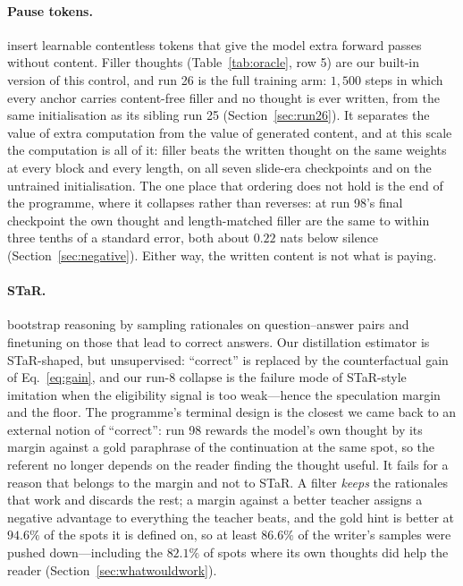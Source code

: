 \documentclass{article} %
\begin{document}
\paragraph{Pause tokens.} \citet{goyal2024think} insert learnable contentless tokens that give the model extra forward passes without content. Filler thoughts (Table~\ref{tab:oracle}, row 5) are our built-in version of this control, and run 26 is the full training arm: $1{,}500$ steps in which every anchor carries content-free filler and no thought is ever written, from the same initialisation as its sibling run 25 (Section~\ref{sec:run26}). It separates the value of extra computation from the value of generated content, and at this scale the computation is all of it: filler beats the written thought on the same weights at every block and every length, on all seven slide-era checkpoints and on the untrained initialisation. The one place that ordering does not hold is the end of the programme, where it collapses rather than reverses: at run 98's final checkpoint the own thought and length-matched filler are the same to within three tenths of a standard error, both about $0.22$ nats below silence (Section~\ref{sec:negative}). Either way, the written content is not what is paying.

\paragraph{STaR.} \citet{zelikman2022star} bootstrap reasoning by sampling rationales on question--answer pairs and finetuning on those that lead to correct answers. Our distillation estimator is STaR-shaped, but unsupervised: ``correct'' is replaced by the counterfactual gain of Eq.~\eqref{eq:gain}, and our run-8 collapse is the failure mode of STaR-style imitation when the eligibility signal is too weak---hence the speculation margin and the floor. The programme's terminal design is the closest we came back to an external notion of ``correct'': run 98 rewards the model's own thought by its margin against a gold paraphrase of the continuation at the same spot, so the referent no longer depends on the reader finding the thought useful. It fails for a reason that belongs to the margin and not to STaR. A filter \emph{keeps} the rationales that work and discards the rest; a margin against a better teacher assigns a negative advantage to everything the teacher beats, and the gold hint is better at $94.6\%$ of the spots it is defined on, so at least $86.6\%$ of the writer's samples were pushed down---including the $82.1\%$ of spots where its own thoughts did help the reader (Section~\ref{sec:whatwouldwork}).
\end{document}
